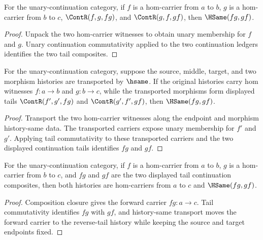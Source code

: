 \begin{theorem}
\label{thm:category-hom-carrier-tail-comm-hsame}
For the unary-continuation category, if \(f\) is a hom-carrier from \(a\) to
\(b\), \(g\) is a hom-carrier from \(b\) to \(c\),
\(\ContR(f,g,fg)\), and \(\ContR(g,f,gf)\), then
\(\HSame(fg,gf)\).
\end{theorem}
\begin{proof}
Unpack the two hom-carrier witnesses to obtain unary membership for \(f\) and
\(g\). Unary continuation commutativity applied to the two continuation
ledgers identifies the two tail composites.
\end{proof}

\begin{theorem}
\label{thm:category-hom-carrier-tail-comm-hsame-congruence}
For the unary-continuation category, suppose the source, middle, target, and
two morphism histories are transported by $\hsame$. If the original histories
carry hom witnesses $f:a\to b$ and $g:b\to c$, while the transported morphisms
form displayed tails $\ContR(f',g',fg)$ and $\ContR(g',f',gf)$, then
$\HSame(fg,gf)$.
\end{theorem}
\begin{proof}
Transport the two hom-carrier witnesses along the endpoint and morphism
history-same data. The transported carriers expose unary membership for
$f'$ and $g'$. Applying tail commutativity to these transported carriers and
the two displayed continuation tails identifies $fg$ and $gf$.
\end{proof}

\begin{theorem}
\label{thm:category-hom-carrier-tail-comm-closed}
For the unary-continuation category, if $f$ is a hom-carrier from $a$ to $b$,
$g$ is a hom-carrier from $b$ to $c$, and $fg$ and $gf$ are the two displayed
tail continuation composites, then both histories are hom-carriers from $a$ to
$c$ and $\HSame(fg,gf)$.
\end{theorem}
\begin{proof}
Composition closure gives the forward carrier $fg:a\to c$. Tail commutativity
identifies $fg$ with $gf$, and history-same transport moves the forward carrier
to the reverse-tail history while keeping the source and target endpoints fixed.
\end{proof}

